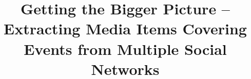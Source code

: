 \documentclass{acm_proc_article-sp}
\begin{document}
\title{Getting the Bigger Picture -- Extracting Media Items Covering Events from Multiple Social Networks}


\maketitle

\end{document}
